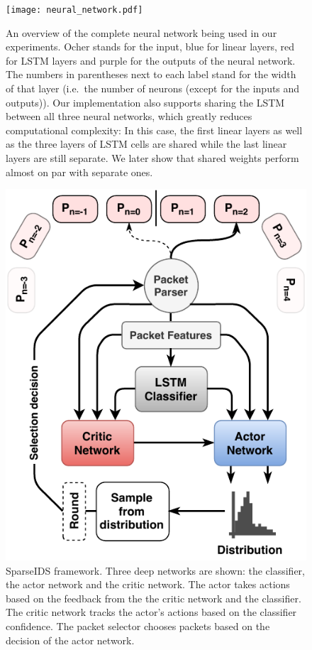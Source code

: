 \documentclass[conference]{IEEEtran}
\newcommand\note[2]{{\color{#1}#2}}
\begin{document}
\begin{figure}[h]
\centering
  \texttt{[image: neural\_network.pdf]}
  \caption{An overview of the complete neural network being used in our experiments. Ocher stands for the input, blue for linear layers, red for LSTM layers and purple for the outputs of the neural network. The numbers in parentheses next to each label stand for the width of that layer (i.e.~the number of neurons (except for the inputs and outputs)). Our implementation also supports sharing the LSTM between all three neural networks, which greatly reduces computational complexity: In this case, the first linear layers as well as the three layers of LSTM cells are shared while the last linear layers are still separate. We later show that shared weights perform almost on par with separate ones.}
  \label{fig:neuralNetworkArchitecture}
\end{figure}


\begin{figure}[h]
\centering
  \includegraphics[width=0.8\columnwidth]{img/rnn-sampling.pdf}
  \caption{SparseIDS framework. Three deep networks are shown: the classifier, the actor network and the critic network. The actor takes actions based on the feedback from the the critic network and the classifier. The critic network tracks the actor's actions based on the classifier confidence. The packet selector chooses packets based on the decision of the actor network.}
  \label{fig:sampling}
\end{figure}
\end{document}
